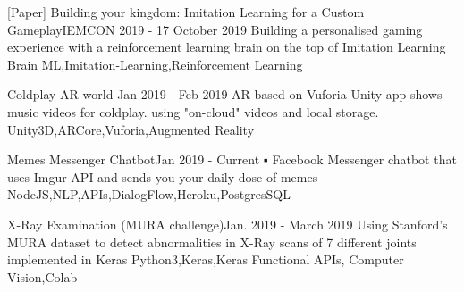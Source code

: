 

\begin{projects}
	
		\project
	{[Paper] Building your kingdom: Imitation Learning for a Custom Gameplay}{IEMCON 2019 - 17 October 2019}
	{\paperSymbol{ }
	}
	{Building a personalised gaming experience with a reinforcement learning brain on the top of Imitation Learning Brain}
	{ML,Imitation-Learning,Reinforcement Learning}
	
	
	\project
	{Coldplay AR world }{Jan 2019 - Feb 2019}
	{ 
	}
	{AR based on Vuforia Unity app shows music videos for coldplay. using "on-cloud" videos and local storage.}
	{Unity3D,ARCore,Vuforia,Augmented Reality}
	
		\project
	{Memes Messenger Chatbot}{Jan 2019 - Current}
	{ }
	{▪	Facebook Messenger chatbot that uses Imgur API and sends you your daily dose of memes }
	{NodeJS,NLP,APIs,DialogFlow,Heroku,PostgresSQL}
	
		\project
	{X-Ray Examination (MURA challenge)}{Jan. 2019 - March 2019}
	{}
	{Using Stanford's MURA dataset to detect abnormalities in X-Ray scans of 7 different joints
implemented in Keras}
	{Python3,Keras,Keras Functional APIs, Computer Vision,Colab}
			
\end{projects}